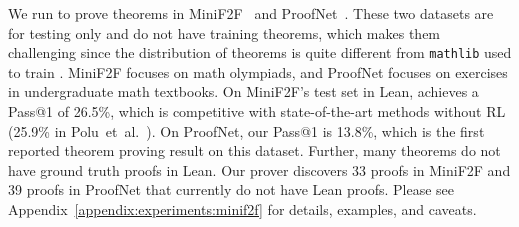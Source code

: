 We run {\name} to prove theorems in MiniF2F~\cite{zheng2022minif2f} and ProofNet~\cite{azerbayev2023proofnet}. These two datasets are for testing only and do not have training theorems, which makes them challenging since the distribution of theorems is quite different from \texttt{mathlib} used to train {\name}. MiniF2F focuses on math olympiads, and ProofNet focuses on exercises in undergraduate math textbooks. On MiniF2F's test set in Lean, {\name} achieves a Pass@1 of 26.5\%, which is competitive with state-of-the-art methods without RL (25.9\% in Polu~et~al.~\cite{polu2023formal}). On ProofNet, our Pass@1 is 13.8\%, which is the first reported theorem proving result on this dataset. Further, many theorems do not have ground truth proofs in Lean. Our prover discovers 33 proofs in MiniF2F and 39 proofs in ProofNet that currently do not have Lean proofs. Please see Appendix~\ref{appendix:experiments:minif2f} for details, examples, and caveats.
